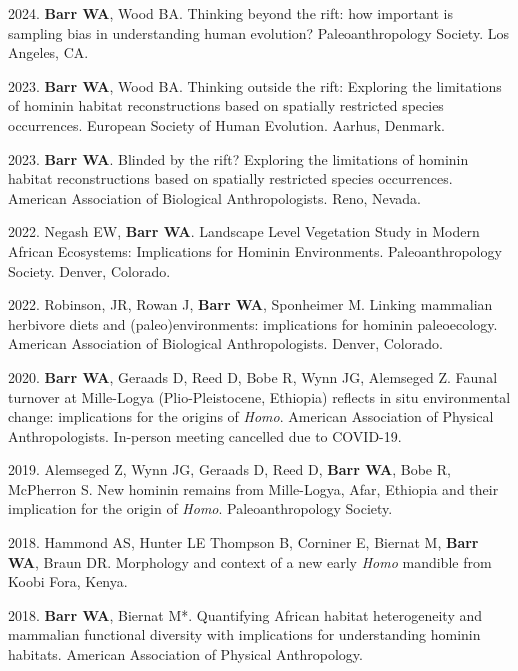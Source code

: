 \documentclass{article}
\begin{document}
\begin{etaremune}

\item 2024. {\bfseries Barr WA}, Wood BA. Thinking beyond the rift: how important is sampling bias in understanding human evolution? Paleoanthropology Society. Los Angeles, CA. 

\item 2023. {\bfseries Barr WA}, Wood BA. Thinking outside the rift: Exploring the limitations of hominin habitat reconstructions based on spatially restricted species occurrences. European Society of Human Evolution.  Aarhus, Denmark. 

\item 2023. {\bfseries Barr WA}. Blinded by the rift? Exploring the limitations of hominin habitat reconstructions based on spatially restricted species occurrences. American Association of Biological Anthropologists.  Reno, Nevada.


\item 2022. Negash EW, {\bfseries Barr WA}. Landscape Level Vegetation Study in Modern African Ecosystems: Implications for Hominin Environments. Paleoanthropology Society. Denver, Colorado. 

 \item 2022. Robinson, JR, Rowan J, {\bfseries Barr WA}, Sponheimer M. Linking mammalian herbivore diets and (paleo)environments: implications for hominin paleoecology. American Association of Biological Anthropologists. Denver, Colorado. 


\item 2020. {\bfseries Barr WA}, Geraads D, Reed D, Bobe R, Wynn JG, Alemseged Z. Faunal turnover at Mille-Logya (Plio-Pleistocene, Ethiopia) reflects in situ environmental change: implications for the origins of \emph{Homo}. American Association of Physical Anthropologists. In-person meeting cancelled due to COVID-19.


\item 2019. Alemseged Z, Wynn JG, Geraads D, Reed D, {\bfseries Barr WA}, Bobe R, McPherron S. New hominin remains from Mille-Logya, Afar, Ethiopia and their implication for the origin of \emph{Homo}. Paleoanthropology Society.

\item 2018. Hammond AS, Hunter LE Thompson B, Corniner E, Biernat M, {\bfseries Barr WA}, Braun DR. Morphology and context of a new early \emph{Homo} mandible from Koobi Fora, Kenya.

\item 2018. {\bfseries Barr WA}, Biernat M*. Quantifying African habitat heterogeneity and mammalian functional diversity with implications for understanding hominin habitats. American Association of Physical Anthropology.



\end{etaremune}
\end{document}
